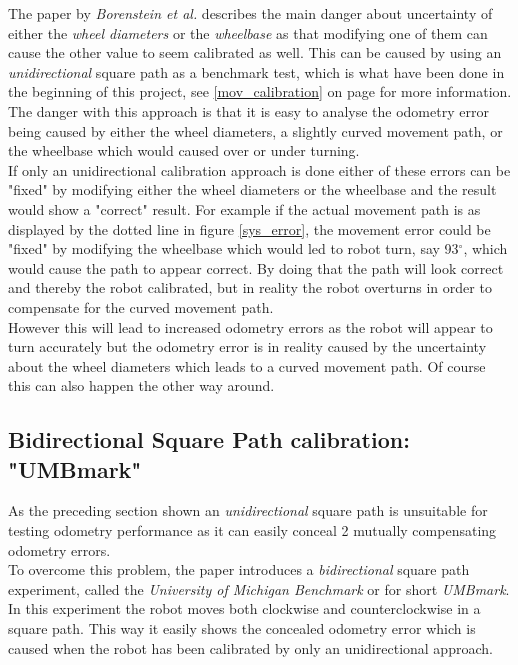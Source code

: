 The paper by \textit{Borenstein et al.} describes the main danger about uncertainty of either the \textit{wheel diameters} or the \textit{wheelbase} as that modifying one of them can cause the other value to seem calibrated as well. This can be caused by using an \textit{unidirectional} square path as a benchmark test, which is what have been done in the beginning of this project, see \ref{mov_calibration} on page \pageref{mov_calibration} for more information. \\
The danger with this approach is that it is easy to analyse the odometry error being caused by either the wheel diameters, a slightly curved movement path, or the wheelbase which would caused over or under turning. \\
If only an unidirectional calibration approach is done either of these errors can be "fixed" by modifying either the wheel diameters or the wheelbase and the result would show a "correct" result.
For example if the actual movement path is as displayed by the dotted line in figure \ref{sys_error}, the movement error could be "fixed" by modifying the wheelbase which would led to robot turn, say 93$^{\circ}$, which would cause the path to appear correct. By doing that the path will look correct and thereby the robot calibrated, but in reality the robot overturns in order to compensate for the curved movement path.\\
However this will lead to increased odometry errors as the robot will appear to turn accurately but the odometry error is in reality caused by the uncertainty about the wheel diameters which leads to a curved movement path. Of course this can also happen the other way around.\\


\subsection{Bidirectional Square Path calibration: "UMBmark"}
As the preceding section shown an \textit{unidirectional} square path is unsuitable for testing odometry performance as it can easily conceal 2 mutually compensating odometry errors.\\
To overcome this problem, the paper introduces a \textit{bidirectional} square path experiment, called the \textit{University of Michigan Benchmark} or for short \textit{UMBmark}.
In this experiment the robot moves both clockwise and counterclockwise in a square path. This way it easily shows the concealed odometry error which is caused when the robot has been calibrated by only an unidirectional approach.\\

